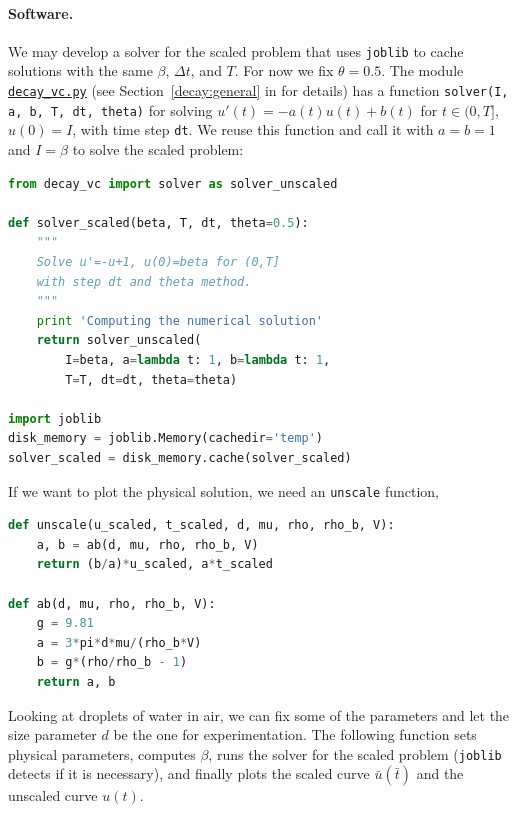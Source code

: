 \documentclass[graybox,envcountchap,sectrefs,final]{svmonodo}
\begin{document}

\paragraph{Software.}
We may develop a solver for the scaled problem that uses \texttt{joblib}
to cache solutions with the same $\beta$, $\Delta t$, and $T$.
For now we fix $\theta=0.5$.
The module \href{{http://tinyurl.com/o8pb3yy/decay_vc.py}}{\nolinkurl{decay_vc.py}}
(see Section~\ref{decay:general} in \cite{Langtangen_decay} for details)
has a function
\texttt{solver(I, a, b, T, dt, theta)} for solving $u'(t)=-a(t)u(t)+b(t)$ for
$t\in (0,T]$, $u(0)=I$, with time step \texttt{dt}.
We reuse this function and call it with $a=b=1$ and $I=\beta$ to solve
the scaled problem:

\begin{lstlisting}[language=Python,style=graycolor]
from decay_vc import solver as solver_unscaled

def solver_scaled(beta, T, dt, theta=0.5):
    """
    Solve u'=-u+1, u(0)=beta for (0,T]
    with step dt and theta method.
    """
    print 'Computing the numerical solution'
    return solver_unscaled(
        I=beta, a=lambda t: 1, b=lambda t: 1,
        T=T, dt=dt, theta=theta)

import joblib
disk_memory = joblib.Memory(cachedir='temp')
solver_scaled = disk_memory.cache(solver_scaled)
\end{lstlisting}
If we want to plot the physical solution, we need an \texttt{unscale} function,

\begin{lstlisting}[language=Python,style=graycolor]
def unscale(u_scaled, t_scaled, d, mu, rho, rho_b, V):
    a, b = ab(d, mu, rho, rho_b, V)
    return (b/a)*u_scaled, a*t_scaled

def ab(d, mu, rho, rho_b, V):
    g = 9.81
    a = 3*pi*d*mu/(rho_b*V)
    b = g*(rho/rho_b - 1)
    return a, b
\end{lstlisting}

Looking at droplets of water in air, we can fix some of the parameters
and let the size parameter $d$ be the one for experimentation.
The following function sets physical parameters, computes $\beta$,
runs the solver for the scaled problem (\texttt{joblib} detects
if it is necessary), and finally plots the scaled curve
$\bar u(\bar t)$ and the unscaled curve $u(t)$.
\end{document}

